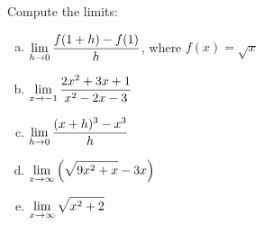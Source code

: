 \documentclass[notes]{subfiles}
\begin{document}
		\begin{ex}
			Compute the limits:
			\begin{enumerate}[(a)]
				\item \(\displaystyle \lim_{h\to 0} \dfrac{f(1+h)-f(1)}{h}\), where \(f(x) = \sqrt{x}\)
					
				\item \(\displaystyle \lim_{x\to -1} \dfrac{2x^2 + 3x + 1}{x^2 - 2x -3}\)
					\newpage
					
				\item \(\displaystyle \lim_{h\to 0} \dfrac{(x+h)^3 - x^3}{h}\)
					
				\item \(\displaystyle \lim_{x\to \infty} \left( \sqrt{9x^2 + x} - 3x\right)\)
					
				\item \(\displaystyle \lim_{x\to \infty} \sqrt{x^2 + 2}\)
			\end{enumerate}
		\end{ex}
\clearpage
\end{document}
